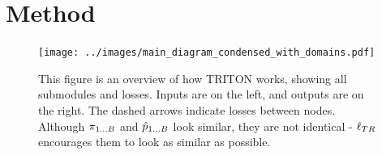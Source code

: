 \documentclass{article}
\begin{document}




\section{Method}
\label{sec:method}


\begin{figure}[H]
	\begin{center}
		\texttt{[image: ../images/main\_diagram\_condensed\_with\_domains.pdf]}
	\end{center}
	\caption{
		This figure is an overview of how TRITON works, showing all submodules and losses.
		Inputs are on the left, and outputs are on the right.
		The dashed arrows indicate losses between nodes.
		Although $\pi_{1\dots B}$ and $\hat{p}_{1\dots B}$ look similar, they are not identical - $\ell_{TR}$ encourages them to look as similar as possible.
	}
	\label{fig:main_diagram}
\end{figure}
\end{document}
